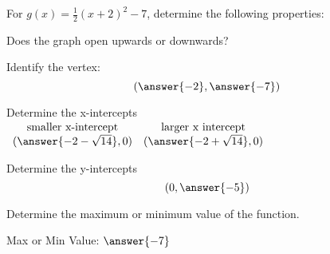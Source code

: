 \documentclass{ximera}
\author{David Kish}
\begin{document}
For $g(x) = \frac{1}{2}(x+2)^2-7$, determine the following properties:
\begin{exercise}
Does the graph open upwards or downwards?
\begin{multipleChoice}
\end{multipleChoice}
\end{exercise}
\begin{exercise}
Identify the vertex:
\[
(\answer{-2},\answer{-7})
\]
\end{exercise}
\begin{exercise}
Determine the x-intercepts\\
$
\begin{array}{cc}
\text{smaller x-intercept} & \text{larger x intercept}\\
(\answer{-2-\sqrt{14}},0) & (\answer{-2+\sqrt{14}},0)
\end{array}
$
\end{exercise}
\begin{exercise}
Determine the y-intercepts
\[
(0,\answer{-5})
\]
\end{exercise}
\begin{exercise}
Determine the maximum or minimum value of the function.
\begin{multipleChoice}
\end{multipleChoice}
Max or Min Value: $\answer{-7}$
\end{exercise}

\end{document}
